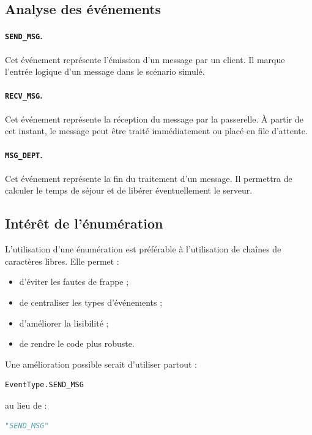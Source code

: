 \documentclass{article}
\begin{document}
\subsection{Analyse des événements}

\paragraph{\texttt{SEND\_MSG}.}
Cet événement représente l’émission d’un message par un client. Il marque l’entrée logique d’un message dans le scénario simulé.

\paragraph{\texttt{RECV\_MSG}.}
Cet événement représente la réception du message par la passerelle. À partir de cet instant, le message peut être traité immédiatement ou placé en file d’attente.

\paragraph{\texttt{MSG\_DEPT}.}
Cet événement représente la fin du traitement d’un message. Il permettra de calculer le temps de séjour et de libérer éventuellement le serveur.

\subsection{Intérêt de l’énumération}

L’utilisation d’une énumération est préférable à l’utilisation de chaînes de caractères libres. Elle permet :
\begin{itemize}[leftmargin=*]
    \item d’éviter les fautes de frappe ;
    \item de centraliser les types d’événements ;
    \item d’améliorer la lisibilité ;
    \item de rendre le code plus robuste.
\end{itemize}

Une amélioration possible serait d’utiliser partout :

\begin{lstlisting}[language=Python]
EventType.SEND_MSG
\end{lstlisting}

au lieu de :

\begin{lstlisting}[language=Python]
"SEND_MSG"
\end{lstlisting}
\end{document}
